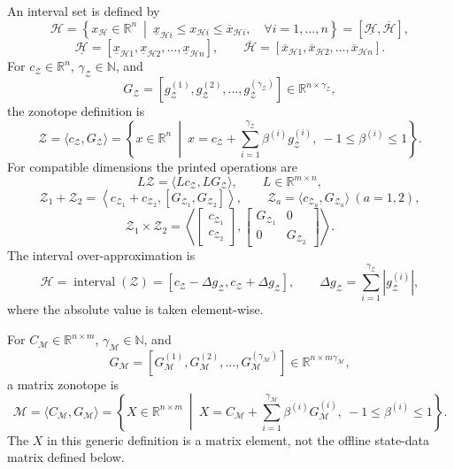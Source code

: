 \documentclass{article}
\begin{document}
An interval set is defined by
\[
\mathcal{H}=\left\{x_{\mathcal{H}}\in\mathbb{R}^n\ \middle|\ \underline{x}_{\mathcal{H}i}\leq x_{\mathcal{H}i}\leq\overline{x}_{\mathcal{H}i},\quad\forall i=1,\ldots,n\right\}
=[\underline{\mathcal{H}},\overline{\mathcal{H}}],
\]
\[
\underline{\mathcal{H}}=[\underline{x}_{\mathcal{H}1},\underline{x}_{\mathcal{H}2},\ldots,\underline{x}_{\mathcal{H}n}],\qquad
\overline{\mathcal{H}}=[\overline{x}_{\mathcal{H}1},\overline{x}_{\mathcal{H}2},\ldots,\overline{x}_{\mathcal{H}n}].
\]
For $c_{\mathcal{Z}}\in\mathbb{R}^n$, $\gamma_{\mathcal{Z}}\in\mathbb{N}$, and
\[
G_{\mathcal{Z}}=[g_{\mathcal{Z}}^{(1)},g_{\mathcal{Z}}^{(2)},\ldots,g_{\mathcal{Z}}^{(\gamma_{\mathcal{Z}})}]\in\mathbb{R}^{n\times\gamma_{\mathcal{Z}}},
\]
the zonotope definition is
\begin{equation}
\mathcal{Z}=\langle c_{\mathcal{Z}},G_{\mathcal{Z}}\rangle
=\left\{x\in\mathbb{R}^n\ \middle|\ x=c_{\mathcal{Z}}+\sum_{i=1}^{\gamma_{\mathcal{Z}}}\beta^{(i)}g_{\mathcal{Z}}^{(i)},\ -1\leq\beta^{(i)}\leq1\right\}. \tag{3}
\end{equation}
For compatible dimensions the printed operations are
\[
L\mathcal{Z}=\langle Lc_{\mathcal{Z}},LG_{\mathcal{Z}}\rangle,\qquad L\in\mathbb{R}^{m\times n},
\]
\[
\mathcal{Z}_1+\mathcal{Z}_2=\left\langle c_{\mathcal{Z}_1}+c_{\mathcal{Z}_2},[G_{\mathcal{Z}_1},G_{\mathcal{Z}_2}]\right\rangle,
\qquad \mathcal{Z}_a=\langle c_{\mathcal{Z}_a},G_{\mathcal{Z}_a}\rangle\ (a=1,2),
\]
\begin{equation}
\mathcal{Z}_1\times\mathcal{Z}_2=
\left\langle\begin{bmatrix}c_{\mathcal{Z}_1}\\c_{\mathcal{Z}_2}\end{bmatrix},
\begin{bmatrix}G_{\mathcal{Z}_1}&0\\0&G_{\mathcal{Z}_2}\end{bmatrix}\right\rangle. \tag{4}
\end{equation}
The interval over-approximation is
\begin{equation}
\mathcal{H}=\operatorname{interval}(\mathcal{Z})=[c_{\mathcal{Z}}-\Delta g_{\mathcal{Z}},c_{\mathcal{Z}}+\Delta g_{\mathcal{Z}}],\qquad
\Delta g_{\mathcal{Z}}=\sum_{i=1}^{\gamma_{\mathcal{Z}}}|g_{\mathcal{Z}}^{(i)}|, \tag{5}
\end{equation}
where the absolute value is taken element-wise.

For $C_{\mathcal{M}}\in\mathbb{R}^{n\times m}$, $\gamma_{\mathcal{M}}\in\mathbb{N}$, and
\[
G_{\mathcal{M}}=[G_{\mathcal{M}}^{(1)},G_{\mathcal{M}}^{(2)},\ldots,G_{\mathcal{M}}^{(\gamma_{\mathcal{M}})}]\in\mathbb{R}^{n\times m\gamma_{\mathcal{M}}},
\]
a matrix zonotope is
\begin{equation}
\mathcal{M}=\langle C_{\mathcal{M}},G_{\mathcal{M}}\rangle
=\left\{X\in\mathbb{R}^{n\times m}\ \middle|\ X=C_{\mathcal{M}}+\sum_{i=1}^{\gamma_{\mathcal{M}}}\beta^{(i)}G_{\mathcal{M}}^{(i)},\ -1\leq\beta^{(i)}\leq1\right\}. \tag{6}
\end{equation}
The $X$ in this generic definition is a matrix element, not the offline state-data matrix defined below.
\end{document}

